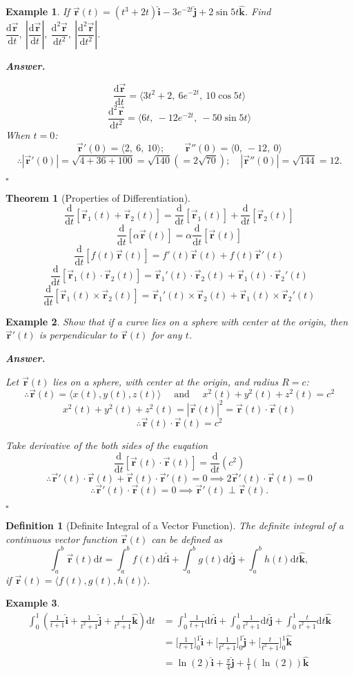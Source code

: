 \documentclass[12pt,a4paper]{article}
\newtheorem{thm}{Theorem}[subsection]
\newtheorem{df}{Definition}[subsection]
\newtheorem{eg}{Example}[subsection]
\newenvironment*{ans}{\par\indent\textbf{\textit{Answer. }}\par}{\par\hfill{$\square$}\par}
\def\dsst{\displaystyle}
\def\d{{\mathrm{d}}}
\def\ddt{\dsst\frac{\d}{\d t}}
\def\vecr{\vec{\boldsymbol{\textbf{r}}}}
\def\veci{\hat{\boldsymbol{\textbf{i}}}}
\def\vecj{\hat{\boldsymbol{\textbf{j}}}}
\def\veck{\hat{\boldsymbol{\textbf{k}}}}
\begin{document}
\begin{eg}
	If $\vecr(t)=(t^3+2t)\veci-3e^{-2t}\vecj+2\sin{5t}\veck$. Find $\dfrac{\d\vecr}{\d t},\ \left|\dfrac{\d\vecr}{\d t}\right|,\ \dfrac{\d^2\vecr}{\d t^2},\ \left|\dfrac{\d^2\vecr}{\d t^2}\right|.$	
	\begin{ans}
		\[\dfrac{\d\vecr}{\d t}=\langle3t^2+2,\ 6e^{-2t},\ 10\cos{5t}\rangle\]
		\[\dfrac{\d^2\vecr}{\d t^2}=\langle6t,\ -12e^{-2t},\ -50\sin{5t}\rangle\]	
		When $t=0$: 
		\[\vecr'(0)=\langle2,\ 6,\ 10\rangle;\qquad\vecr''(0)=\langle0,\ -12,\ 0\rangle\]
		\[\therefore|\vecr'(0)|=\sqrt{4+36+100}=\sqrt{140}(=2\sqrt{70});\quad|\vecr''(0)|=\sqrt{144}=12.\]
	\end{ans}
\end{eg}
\begin{thm}[Properties of Differentiation]
	\[\ddt[\vecr_1(t)+\vecr_2(t)]=\ddt[\vecr_1(t)]+\ddt[\vecr_2(t)]\]
	\[\ddt[\alpha\vecr(t)]=\alpha\ddt[\vecr(t)]\]
	\[\ddt[f(t)\vecr(t)]=f'(t)\vecr(t)+f(t)\vecr'(t)\]
	\[\ddt[\vecr_1(t)\cdot\vecr_2(t)]=\vecr_1'(t)\cdot\vecr_2(t)+\vecr_1(t)\cdot\vecr_2'(t)\]
	\[\ddt[\vecr_1(t)\times\vecr_2(t)]=\vecr_1'(t)\times\vecr_2(t)+\vecr_1(t)\times\vecr_2'(t)\]	
\end{thm}
\begin{eg}
	Show that if a curve lies on a sphere with center at the origin, then $\vecr'(t)$ is perpendicular to $\vecr(t)$ for any $t$. 
	\begin{ans}
		Let $\vecr(t)$ lies on a sphere, with center at the origin, and radius $R=c$: \[\therefore\vecr(t)=\langle x(t), y(t), z(t)\rangle\quad\text{ and }\quad x^2(t)+y^2(t)+z^2(t)=c^2\]
		\[x^2(t)+y^2(t)+z^2(t)=|\vecr(t)|^2=\vecr(t)\cdot\vecr(t)\]
		\[\therefore\vecr(t)\cdot\vecr(t)=c^2\]\par
		Take derivative of the both sides of the euqation \[\ddt[\vecr(t)\cdot\vecr(t)]=\ddt(c^2)\]
		\[\therefore\vecr'(t)\cdot\vecr(t)+\vecr(t)\cdot\vecr'(t)=0\implies2\vecr'(t)\cdot\vecr(t)=0\]
		\[\therefore\vecr'(t)\cdot\vecr(t)=0\implies\vecr'(t)\perp\vecr(t).\]
	\end{ans}
\end{eg}
\begin{df}[Definite Integral of a Vector Function]
	The definite integral of a continuous vector function $\vecr(t)$ can be defined as \[\int_a^b\vecr(t)\d t=\int_a^bf(t)\d t\veci+\int_a^bg(t)\d t\vecj+\int_a^bh(t)\d t\veck, \] if $\vecr(t)=\Big\langle f(t), g(t), h(t)\Big\rangle.$
\end{df}
\begin{eg}
	\[\begin{aligned}
	\int_0^1\left(\frac{1}{t+1}\veci+\frac{1}{t^2+1}\vecj+\frac{t}{t^2+1}\veck\right)\d t&=\int_0^1\frac{1}{t+1}\d t\veci+\int_0^1\frac{1}{t^2+1}\d t\vecj+\int_0^1\frac{t}{t^2+1}\d t\veck\\
	&=\Bigg[\frac{1}{t+1}\Bigg]_0^1\veci+\Bigg[\frac{1}{t^2+1}\Bigg]_0^1\vecj+\Bigg[\frac{t}{t^2+1}\Bigg]_0^1\veck\\
	&=\ln(2)\veci+\frac{\pi}{4}\vecj+\frac{1}{1}(\ln(2))\veck
	\end{aligned}\]	
\end{eg}
\end{document}
